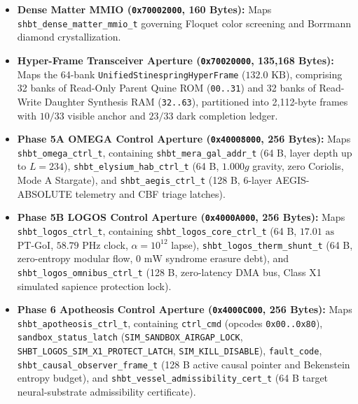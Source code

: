 \documentclass[11pt,onecolumn]{article}
\begin{document}
\begin{itemize}
    \item \textbf{Dense Matter MMIO (\texttt{0x70002000}, 160 Bytes):} Maps \texttt{shbt\_dense\_matter\_mmio\_t} governing Floquet color screening and Borrmann diamond crystallization.
    \item \textbf{Hyper-Frame Transceiver Aperture (\texttt{0x70020000}, 135,168 Bytes):} Maps the 64-bank \texttt{UnifiedStinespringHyperFrame} ($132.0\text{ KB}$), comprising 32 banks of Read-Only Parent Quine ROM (\texttt{00..31}) and 32 banks of Read-Write Daughter Synthesis RAM (\texttt{32..63}), partitioned into 2,112-byte frames with $10/33$ visible anchor and $23/33$ dark completion ledger.
    \item \textbf{Phase 5A OMEGA Control Aperture (\texttt{0x40008000}, 256 Bytes):} Maps \texttt{shbt\_omega\_ctrl\_t}, containing \texttt{shbt\_mera\_gal\_addr\_t} (64 B, layer depth up to $L=234$), \texttt{shbt\_elysium\_hab\_ctrl\_t} (64 B, $1.000g$ gravity, zero Coriolis, Mode A Stargate), and \texttt{shbt\_aegis\_ctrl\_t} (128 B, 6-layer AEGIS-ABSOLUTE telemetry and CBF triage latches).
    \item \textbf{Phase 5B LOGOS Control Aperture (\texttt{0x4000A000}, 256 Bytes):} Maps \texttt{shbt\_logos\_ctrl\_t}, containing \texttt{shbt\_logos\_core\_ctrl\_t} (64 B, $17.01\text{ as}$ PT-GoI, $58.79\text{ PHz}$ clock, $\alpha=10^{12}$ lapse), \texttt{shbt\_logos\_therm\_shunt\_t} (64 B, zero-entropy modular flow, $0\text{ mW}$ syndrome erasure debt), and \texttt{shbt\_logos\_omnibus\_ctrl\_t} (128 B, zero-latency DMA bus, Class X1 simulated sapience protection lock).
    \item \textbf{Phase 6 Apotheosis Control Aperture (\texttt{0x4000C000}, 256 Bytes):} Maps \texttt{shbt\_apotheosis\_ctrl\_t}, containing \texttt{ctrl\_cmd} (opcodes \texttt{0x00..0x80}), \texttt{sandbox\_status\_latch} (\texttt{SIM\_SANDBOX\_AIRGAP\_LOCK}, \texttt{SHBT\_LOGOS\_SIM\_X1\_PROTECT\_LATCH}, \texttt{SIM\_KILL\_DISABLE}), \texttt{fault\_code}, \texttt{shbt\_causal\_observer\_frame\_t} (128 B active causal pointer and Bekenstein entropy budget), and \texttt{shbt\_vessel\_admissibility\_cert\_t} (64 B target neural-substrate admissibility certificate).
\end{itemize}

\FloatBarrier
\end{document}
